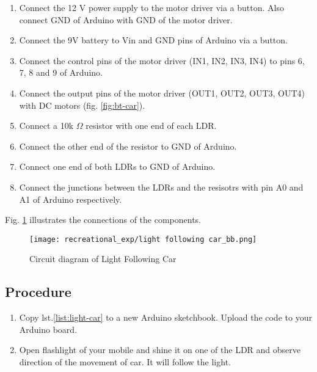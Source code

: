 \begin{enumerate}[leftmargin=*] 
    \item Connect the 12 V power supply to the motor driver via a button. Also connect GND of Arduino with GND of the motor driver.
    \item Connect the 9V battery to Vin and GND pins of Arduino via a button. 
    \item Connect the control pins of the motor driver (IN1, IN2, IN3, IN4) to pins 6, 7, 8 and 9 of Arduino.
    \item Connect the output pins of the motor driver (OUT1, OUT2, OUT3, OUT4) with DC motors (fig. \ref{fig:bt-car}).
    \item Connect a 10k $\Omega$ resistor with one end of each LDR. 
    \item Connect the other end of the resistor to GND of Arduino. 
    \item Connect one end of both LDRs to GND of Arduino.
    \item Connect the junctions between the LDRs and the resisotrs with pin A0 and A1 of Arduino respectively.
\end{enumerate}

Fig. \ref{fig:lfc} illustrates the connections of the components.
	\begin{figure}[H]
	\centering 
	\texttt{[image: recreational\_exp/light following car\_bb.png]}
	\caption{Circuit diagram of Light Following Car}
	\label{fig:lfc}
	\end{figure}
	
\subsection*{Procedure}
\begin{enumerate}[leftmargin=*]
    \item Copy lst.\ref{list:light-car} to a new Arduino sketchbook. Upload the code to your Arduino board.
    \item Open flashlight of your mobile and shine it on one of the LDR and observe direction of the movement of car. It will follow the light. 
\end{enumerate}

